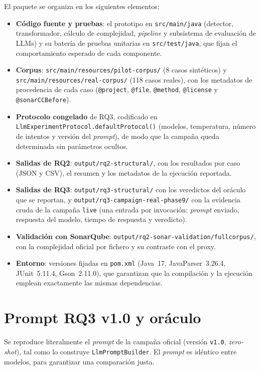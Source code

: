 El paquete se organiza en los siguientes elementos:
\begin{itemize}
  \item \textbf{Código fuente y pruebas}: el prototipo en
  \texttt{src/main/java} (detector, transformador, cálculo de complejidad,
  \emph{pipeline} y subsistema de evaluación de LLMs) y su batería de pruebas
  unitarias en \texttt{src/test/java}, que fijan el comportamiento esperado de
  cada componente.
  \item \textbf{Corpus}: \texttt{src/\allowbreak main/\allowbreak resources/\allowbreak pilot-corpus/} (8 casos
  sintéticos) y \texttt{src/\allowbreak main/\allowbreak resources/\allowbreak real-corpus/} (118 casos reales),
  con los metadatos de procedencia de cada caso (\lstinline|@project|,
  \lstinline|@file|, \lstinline|@method|, \lstinline|@license| y
  \lstinline|@sonarCCBefore|).
  \item \textbf{Protocolo congelado} de RQ3, codificado en
  \lstinline|LlmExperimentProtocol.defaultProtocol()| (modelos, temperatura,
  número de intentos y versión del \emph{prompt}), de modo que la campaña queda
  determinada sin parámetros ocultos.
  \item \textbf{Salidas de RQ2}: \texttt{output/rq2-structural/}, con los
  resultados por caso (JSON y CSV), el resumen y los metadatos de la ejecución
  reportada.
  \item \textbf{Salidas de RQ3}: \texttt{output/\allowbreak rq3-structural/} con los
  veredictos del oráculo que se reportan, y
  \texttt{output/\allowbreak rq3-campaign-real-phase9/} con la evidencia cruda de la campaña
  \lstinline|live| (una entrada por invocación: \emph{prompt} enviado, respuesta
  del modelo, tiempo de respuesta y veredicto).
  \item \textbf{Validación con SonarQube}:
  \texttt{output/\allowbreak rq2-sonar-validation/\allowbreak fullcorpus/}, con la complejidad oficial
  por fichero y su contraste con el proxy.
  \item \textbf{Entorno}: versiones fijadas en \texttt{pom.xml} (Java~17,
  JavaParser~3.26.4, JUnit~5.11.4, Gson~2.11.0), que garantizan que la
  compilación y la ejecución emplean exactamente las mismas dependencias.
\end{itemize}

\chapter{Prompt RQ3 v1.0 y oráculo}
\label{ap:prompt}
Se reproduce literalmente el \emph{prompt} de la campaña oficial (versión
\texttt{v1.0}, \emph{zero-shot}), tal como lo construye
\texttt{LlmPromptBuilder}. El \emph{prompt} es idéntico entre modelos, para
garantizar una comparación justa.

